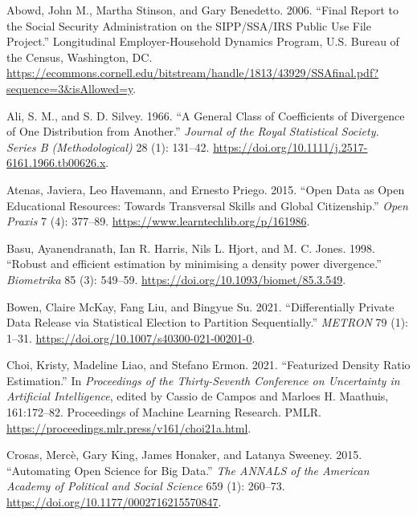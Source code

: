 \documentclass[
]{article}
\newlength{\cslhangindent}
\newenvironment{CSLReferences}[2] %
 {\begin{list}{}{%
  \setlength{\itemindent}{0pt}
  \setlength{\leftmargin}{0pt}
  \setlength{\parsep}{0pt}
  \ifodd #1
   \setlength{\leftmargin}{\cslhangindent}
   \setlength{\itemindent}{-1\cslhangindent}
  \fi
  \setlength{\itemsep}{#2\baselineskip}}}
 {\end{list}}
\begin{document}
\label{refs}
\begin{CSLReferences}{1}{0}
Abowd, John M., Martha Stinson, and Gary Benedetto. 2006. {``Final
Report to the Social Security Administration on the {SIPP/SSA/IRS}
Public Use File Project.''} Longitudinal Employer-Household Dynamics
Program, U.S. Bureau of the Census, Washington, DC.
\url{https://ecommons.cornell.edu/bitstream/handle/1813/43929/SSAfinal.pdf?sequence=3&isAllowed=y}.

Ali, S. M., and S. D. Silvey. 1966. {``A General Class of Coefficients
of Divergence of One Distribution from Another.''} \emph{Journal of the
Royal Statistical Society. Series B (Methodological)} 28 (1): 131--42.
\url{https://doi.org/10.1111/j.2517-6161.1966.tb00626.x}.

Atenas, Javiera, Leo Havemann, and Ernesto Priego. 2015. {``Open Data as
Open Educational Resources: Towards Transversal Skills and Global
Citizenship.''} \emph{Open Praxis} 7 (4): 377--89.
\url{https://www.learntechlib.org/p/161986}.

Basu, Ayanendranath, Ian R. Harris, Nils L. Hjort, and M. C. Jones.
1998. {``{Robust and efficient estimation by minimising a density power
divergence}.''} \emph{Biometrika} 85 (3): 549--59.
\url{https://doi.org/10.1093/biomet/85.3.549}.

Bowen, Claire McKay, Fang Liu, and Bingyue Su. 2021. {``Differentially
Private Data Release via Statistical Election to Partition
Sequentially.''} \emph{METRON} 79 (1): 1--31.
\url{https://doi.org/10.1007/s40300-021-00201-0}.

Choi, Kristy, Madeline Liao, and Stefano Ermon. 2021. {``Featurized
Density Ratio Estimation.''} In \emph{Proceedings of the Thirty-Seventh
Conference on Uncertainty in Artificial Intelligence}, edited by Cassio
de Campos and Marloes H. Maathuis, 161:172--82. Proceedings of Machine
Learning Research. PMLR.
\url{https://proceedings.mlr.press/v161/choi21a.html}.

Crosas, Mercè, Gary King, James Honaker, and Latanya Sweeney. 2015.
{``Automating Open Science for Big Data.''} \emph{The ANNALS of the
American Academy of Political and Social Science} 659 (1): 260--73.
\url{https://doi.org/10.1177/0002716215570847}.


\end{CSLReferences}
\end{document}
